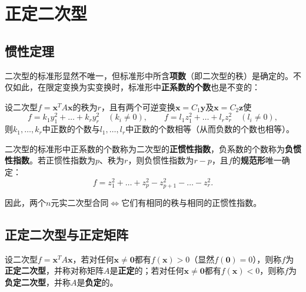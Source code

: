 


\section{正定二次型}

\subsection{惯性定理}
二次型的标准形显然不唯一，但标准形中所含\textbf{项数}（即二次型的秩）是确定的。不仅如此，在限定变换为实变换时，标准形中\textbf{正系数的个数}也是不变的：

\begin{theorem}[惯性定理]
设二次型$f=\boldsymbol{x}^{T}A\boldsymbol{x}$的秩为$r$，且有两个可逆变换$\boldsymbol{x}=C_1\boldsymbol{y}$及$\boldsymbol{x}=C_2\boldsymbol{z}$使
\[
f=k_1y_1^{2}+\dots+k_ry_r^{2}\quad(k_i\ne0),
\qquad
f=l_1z_1^{2}+\dots+l_rz_r^{2}\quad(l_i\ne0),
\]
则$k_1,\dots,k_r$中正数的个数与$l_1,\dots,l_r$中正数的个数相等（从而负数的个数也相等）。
\end{theorem}

二次型的标准形中正系数的个数称为二次型的\textbf{正惯性指数}，负系数的个数称为\textbf{负惯性指数}。若正惯性指数为$p$、秩为$r$，则负惯性指数为$r-p$，且$f$的\textbf{规范形}唯一确定：
\[
f=z_1^{2}+\dots+z_p^{2}-z_{p+1}^{2}-\dots-z_r^{2}.
\]

因此，两个$n$元实二次型合同$\iff$它们有相同的秩与相同的正惯性指数。

\subsection{正定二次型与正定矩阵}
\begin{definition}[正定、负定]
设二次型$f=\boldsymbol{x}^{T}A\boldsymbol{x}$，若对任何$\boldsymbol{x}\ne\boldsymbol{0}$都有$f(\boldsymbol{x})>0$（显然$f(\boldsymbol{0})=0$），则称$f$为\textbf{正定二次型}，并称对称矩阵$A$是\textbf{正定}的；若对任何$\boldsymbol{x}\ne\boldsymbol{0}$都有$f(\boldsymbol{x})<0$，则称$f$为\textbf{负定二次型}，并称$A$是\textbf{负定}的。
\end{definition}

